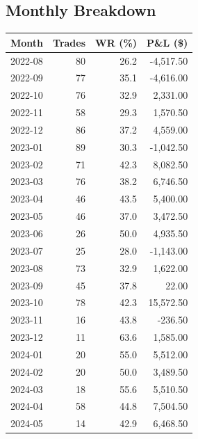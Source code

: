 \documentclass[11pt,a4paper,twoside]{article}
\begin{document}
\subsection*{Monthly Breakdown}
\noindent\begin{center}
\begin{tabular}{>{\color{txtmain}}l rrr}
\toprule
\rowcolor{cardbg}
\textbf{Month} & \textbf{Trades} & \textbf{WR (\%)} & \textbf{P\&L (\$)} \\
\midrule
2022-08 & 80 & 26.2 & \textcolor{lossred}{-4,517.50} \\
2022-09 & 77 & 35.1 & \textcolor{lossred}{-4,616.00} \\
2022-10 & 76 & 32.9 & \textcolor{wingreen}{2,331.00} \\
2022-11 & 58 & 29.3 & \textcolor{wingreen}{1,570.50} \\
2022-12 & 86 & 37.2 & \textcolor{wingreen}{4,559.00} \\
2023-01 & 89 & 30.3 & \textcolor{lossred}{-1,042.50} \\
2023-02 & 71 & 42.3 & \textcolor{wingreen}{8,082.50} \\
2023-03 & 76 & 38.2 & \textcolor{wingreen}{6,746.50} \\
2023-04 & 46 & 43.5 & \textcolor{wingreen}{5,400.00} \\
2023-05 & 46 & 37.0 & \textcolor{wingreen}{3,472.50} \\
2023-06 & 26 & 50.0 & \textcolor{wingreen}{4,935.50} \\
2023-07 & 25 & 28.0 & \textcolor{lossred}{-1,143.00} \\
2023-08 & 73 & 32.9 & \textcolor{wingreen}{1,622.00} \\
2023-09 & 45 & 37.8 & \textcolor{wingreen}{22.00} \\
2023-10 & 78 & 42.3 & \textcolor{wingreen}{15,572.50} \\
2023-11 & 16 & 43.8 & \textcolor{lossred}{-236.50} \\
2023-12 & 11 & 63.6 & \textcolor{wingreen}{1,585.00} \\
2024-01 & 20 & 55.0 & \textcolor{wingreen}{5,512.00} \\
2024-02 & 20 & 50.0 & \textcolor{wingreen}{3,489.50} \\
2024-03 & 18 & 55.6 & \textcolor{wingreen}{5,510.50} \\
2024-04 & 58 & 44.8 & \textcolor{wingreen}{7,504.50} \\
2024-05 & 14 & 42.9 & \textcolor{wingreen}{6,468.50} \\

\end{tabular}
\end{center}
\end{document}
